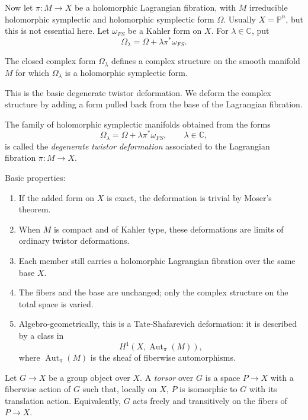 Now let $\pi:M\to X$ be a holomorphic
Lagrangian fibration, with $M$ irreducible
holomorphic symplectic and holomorphic
symplectic form $\Omega$.
Usually $X=\mathbb{P}^n$, but this is not
essential here.
Let $\omega_{FS}$ be a Kahler form on $X$.
For $\lambda\in\mathbb{C}$, put
$$
\Omega_\lambda=
\Omega+\lambda\pi^*\omega_{FS}.
$$

\begin{lemma}
\label{claim-degenerate-twistor-form}
The closed complex form $\Omega_\lambda$
defines a complex structure on the smooth
manifold $M$ for which $\Omega_\lambda$ is a
holomorphic symplectic form.
\end{lemma}

\noindent
This is the basic degenerate twistor
deformation.
We deform the complex structure by adding a
form pulled back from the base of the
Lagrangian fibration.

\begin{definition}
\label{definition-degenerate-twistor-def}
The family of holomorphic symplectic
manifolds obtained from the forms
$$
\Omega_\lambda=
\Omega+\lambda\pi^*\omega_{FS},
\qquad \lambda\in\mathbb{C},
$$
is called the {\it degenerate twistor
deformation} associated to the Lagrangian
fibration $\pi:M\to X$.
\end{definition}

\noindent
Basic properties:
\begin{enumerate}
\item If the added form on $X$ is exact, the
deformation is trivial by Moser's theorem.
\item When $M$ is compact and of Kahler type,
these deformations are limits of ordinary
twistor deformations.
\item Each member still carries a
holomorphic Lagrangian fibration over the
same base $X$.
\item The fibers and the base are unchanged;
only the complex structure on the total
space is varied.
\item Algebro-geometrically, this is a
Tate-Shafarevich deformation: it is described
by a class in
$$
H^1(X,\operatorname{Aut}_\pi(M)),
$$
where $\operatorname{Aut}_\pi(M)$ is the
sheaf of fiberwise automorphisms.
\end{enumerate}

\begin{definition}
\label{definition-torsor}
Let $G\to X$ be a group object over $X$.
A {\it torsor} over $G$ is a space
$P\to X$ with a fiberwise action of $G$ such
that, locally on $X$, $P$ is isomorphic to
$G$ with its translation action.
Equivalently, $G$ acts freely and
transitively on the fibers of $P\to X$.
\end{definition}

